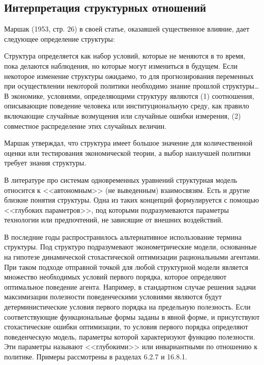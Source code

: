 \subsection{Интерпретация структурных отношений}


Маршак (1953, стр. 26) в своей статье, оказавшей существенное влияние, дает следующее определение структуры: 


Структура определяется как набор условий, которые не меняются в то время, пока делаются наблюдения, но которые могут измениться в будущем. Если некоторое изменение структуры ожидаемо, то для прогнозирования переменных при осуществлении некоторой политики необходимо  знание прошлой структуры\ldots 
В экономике, условиями, определяющими структуру являются (1) соотношения, описывающие поведение человека или институциональную среду, как правило включающие случайные возмущения или случайные ошибки измерения, (2) совместное распределение этих случайных величин. 


Маршак утверждал, что структура имеет большое значение для количественной оценки или тестирования экономической теории, а выбор наилучшей политики требует знания структуры. 


В литературе про системам одновременных уравнений  структурная модель относится к <<автономным>> (не выведенным) взаимосвязям. Есть и другие близкие понятия структуры. Одна из таких концепций формулируется с помощью <<глубоких параметров>>, под которыми подразумеваются параметры технологии или предпочтений, не зависящие от внешних воздействий. 


В последние годы распространилось альтернативное использование термина структуры. Под структуро подразумевают эконометрические модели, основанные на гипотезе динамической стохастической оптимизации рациональными агентами. При таком подходе отправной точкой для любой структурной модели  является множество необходимых условий первого порядка, которое определяют оптимальное поведение агента. 
Например, в стандартном случае  решения задачи максимизации полезности поведенческими условиями являются будут детерминистические условия первого порядка на предельную полезность. Если соответствующие функциональные формы заданы в явной форме, и присутствуют стохастические ошибки оптимизации, то условия первого порядка определяют поведенческую модель, параметры которой характеризуют функцию полезности. Эти параметры называют  <<глубокими>> или инвариантными по отношению к политике. Примеры рассмотрены в разделах 6.2.7 и 16.8.1. 


